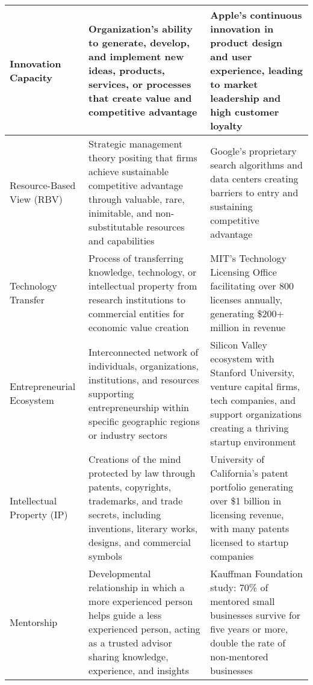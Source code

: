 \documentclass[../Main.tex]{subfiles}
\begin{document}
\begin{longtable}{|p{2.5cm}|p{6cm}|p{5cm}|}
\hline
Innovation Capacity & Organization's ability to generate, develop, and implement new ideas, products, services, or processes that create value and competitive advantage \autocite{lawson2001developing, hurley1998innovation} & Apple's continuous innovation in product design and user experience, leading to market leadership and high customer loyalty \\
\hline
Resource-Based View (RBV) & Strategic management theory positing that firms achieve sustainable competitive advantage through valuable, rare, inimitable, and non-substitutable resources and capabilities \autocite{barney1991firm, wernerfelt1984resource} & Google's proprietary search algorithms and data centers creating barriers to entry and sustaining competitive advantage \\
\hline
Technology Transfer & Process of transferring knowledge, technology, or intellectual property from research institutions to commercial entities for economic value creation \autocite{bozeman2000technology, siegel2003assessing} & MIT's Technology Licensing Office facilitating over 800 licenses annually, generating \$200+ million in revenue \autocite{MITSandbox2024} \\
\hline
Entrepreneurial Ecosystem & Interconnected network of individuals, organizations, institutions, and resources supporting entrepreneurship within specific geographic regions or industry sectors \autocite{spigel2017relational, stam2015entrepreneurial} & Silicon Valley ecosystem with Stanford University, venture capital firms, tech companies, and support organizations creating a thriving startup environment \\
\hline
Intellectual Property (IP) & Creations of the mind protected by law through patents, copyrights, trademarks, and trade secrets, including inventions, literary works, designs, and commercial symbols \autocite{wipo2020intellectual} & University of California's patent portfolio generating over \$1 billion in licensing revenue, with many patents licensed to startup companies \\
\hline
Mentorship & Developmental relationship in which a more experienced person helps guide a less experienced person, acting as a trusted advisor sharing knowledge, experience, and insights \autocite{jacobi1991mentorship, nationalacademies2019mentoring} & Kauffman Foundation study: 70\% of mentored small businesses survive for five years or more, double the rate of non-mentored businesses \autocite{kauffman2013mentoring} \\
\hline

\end{longtable}
\end{document}
